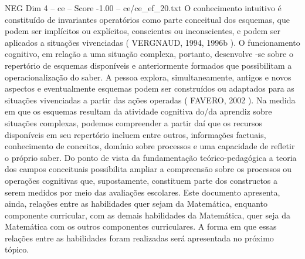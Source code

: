 \begin{textsample}{NEG Dim 4 – ce – Score -1.00 – ce/ce\_ef\_20.txt}
O conhecimento intuitivo é constituído de invariantes operatórios como parte conceitual dos esquemas, que podem ser implícitos ou explícitos, conscientes ou inconscientes, e podem ser aplicados a situações vivenciadas ( VERGNAUD, 1994, 1996b ).
O funcionamento cognitivo, em relação a uma situação complexa, portanto, desenvolve -se sobre o repertório de esquemas disponíveis e anteriormente formados que possibilitam a operacionalização do saber.
A pessoa explora, simultaneamente, antigos e novos aspectos e eventualmente esquemas podem ser construídos ou adaptados para as situações vivenciadas a partir das ações operadas ( FAVERO, 2002 ).
Na medida em que os esquemas resultam da atividade cognitiva do/da aprendiz sobre situações complexas, podemos compreender a partir daí que os recursos disponíveis em seu repertório incluem entre outros, informações factuais, conhecimento de conceitos, domínio sobre processos e uma capacidade de refletir o próprio saber.
Do ponto de vista da fundamentação teórico-pedagógica a teoria dos campos conceituais possibilita ampliar a compreensão sobre os processos ou operações cognitivas que, supostamente, constituem parte dos constructos a serem medidos por meio das avaliações escolares.
Este documento apresenta, ainda, relações entre as habilidades quer sejam da Matemática, enquanto componente curricular, com as demais habilidades da Matemática, quer seja da Matemática com os outros componentes curriculares.
A forma em que essas relações entre as habilidades foram realizadas será apresentada no próximo tópico.

\end{textsample}
